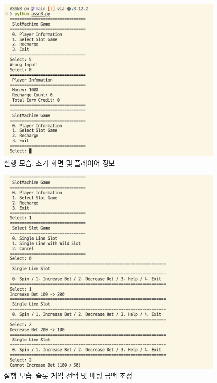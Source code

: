 \documentclass{article}
\begin{document}
\begin{figure}
  \includegraphics[width=\textwidth]{assets/screenshots/1.png}
  \caption{실행 모습. 초기 화면 및 플레이어 정보}
  \label{img:1}
\end{figure}
\begin{figure}
  \includegraphics[width=\textwidth]{assets/screenshots/2.png}
  \caption{실행 모습. 슬롯 게임 선택 및 베팅 금액 조정}
  \label{img:2}
\end{figure}
\end{document}
